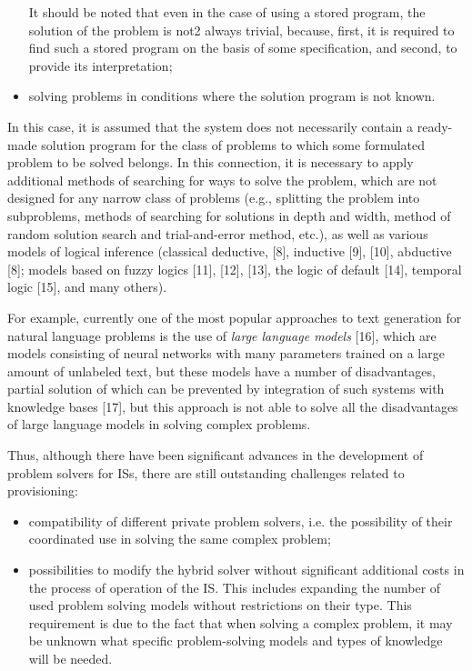 \documentclass [11pt, a4paper]{article}
\begin{document}
\begin{multicols}{2}
\begin{itemize}
\begin{itemize}
 
\end{itemize}
It should be noted that even in the case of using a
stored program, the solution of the problem is not2
always trivial, because, first, it is required to find
such a stored program on the basis of some specification, and second, to provide its interpretation;
\item solving problems in conditions where the solution
program is not known.
\end{itemize}
In this case, it is assumed that the system does not
necessarily contain a ready-made solution program for
the class of problems to which some formulated problem
to be solved belongs. In this connection, it is necessary to
apply additional methods of searching for ways to solve
the problem, which are not designed for any narrow class
of problems (e.g., splitting the problem into subproblems,
methods of searching for solutions in depth and width,
method of random solution search and trial-and-error
method, etc.), as well as various models of logical
inference (classical deductive, [8], inductive [9], [10],
abductive [8]; models based on fuzzy logics [11], [12],
[13], the logic of default [14], temporal logic [15], and
many others).
\par \quad For example, currently one of the most popular approaches to text generation for natural language problems is the use of \textit{large language models} [16], which are models consisting of neural networks with many parameters trained on a large amount of unlabeled text, but these
models have a number of disadvantages, partial solution
of which can be prevented by integration of such systems
with knowledge bases [17], but this approach is not able
to solve all the disadvantages of large language models
in solving complex problems.
\par \quad Thus, although there have been significant advances
in the development of problem solvers for ISs, there are
still outstanding challenges related to provisioning:
\begin{itemize}
  \item compatibility of different private problem solvers,
i.e. the possibility of their coordinated use in solving
the same complex problem;
\item possibilities to modify the hybrid solver without significant additional costs in the process of operation
of the IS. This includes expanding the number of
used problem solving models without restrictions
on their type. This requirement is due to the fact
that when solving a complex problem, it may be
unknown what specific problem-solving models and
types of knowledge will be needed.


\end{itemize}
\end{multicols}
\end{document}
